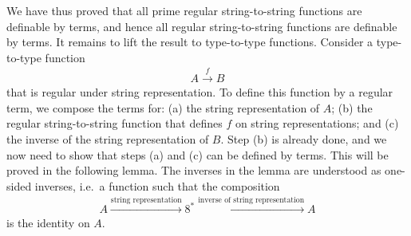 We have thus proved that all prime regular string-to-string functions are definable by terms, and hence all regular string-to-string functions are definable by terms. It remains to lift the result to type-to-type functions. Consider  a type-to-type function 
\begin{align*}
A \xrightarrow f B
\end{align*}
that is regular under string representation. To define this function by a regular term, we compose the terms for: (a) the string representation of $A$; (b) the regular string-to-string function that defines $f$ on string representations; and (c) the inverse of the string representation of $B$.  Step (b) is already done, and we now need to show that steps (a) and (c) can be defined by terms. This will be proved in the following lemma.  The inverses in the lemma are understood as one-sided inverses, i.e.~a function such that the composition 
\begin{align*}
A \xrightarrow{\text{string representation}}
8^*
\xrightarrow{\text{inverse of string representation}}
A
\end{align*}
is the identity on $A$.


